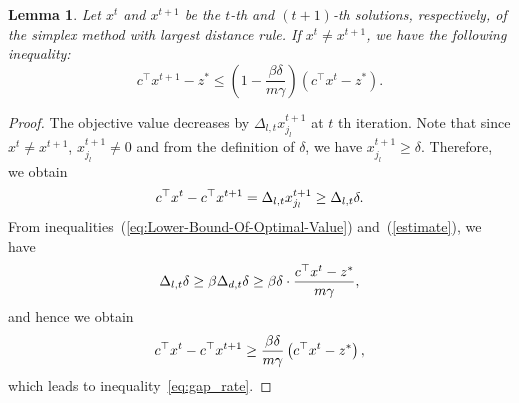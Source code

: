 \documentclass[10pt,a4paper]{amsart}
\newtheorem{lemma}{Lemma}
\begin{document}
\begin{lemma} \label{lm:gap_rate}
Let $x^t$ and $x^{t+1}$ be the $t$-th and $(t+1)$-th solutions, respectively, of the simplex method with largest distance rule.
If $x^t\not=x^{t+1}$, we have the following inequality:
\begin{equation} \label{eq:gap_rate}
  c^{\top} x^{t+1} - z^* \le \left( 1 - \frac{\beta \delta}{m \gamma} \right) \left( c^{\top} x^{t} - z^* \right).
\end{equation}
\end{lemma}

\begin{proof}
The objective value decreases by $\Delta_{l,t} x_{j_{l}}^{t+1}$ at $t$ th iteration.
Note that since $x^t\not=x^{t+1}$, $x_{j_{l}}^{t+1}\not=0$ and from the definition of $\delta$, we have $x_{j_{l}}^{t+1}\ge\delta$.
Therefore, we obtain 
\begin{equation} \notag
  c^{\top} x^{t} - c^{\top} x^{t+1} = \Delta_{l,t} x_{j_{l}}^{t+1} \ge \Delta_{l,t} \delta.
\end{equation}
From inequalities~(\ref{eq:Lower-Bound-Of-Optimal-Value}) and~(\ref{estimate}), we have
\begin{equation} \notag
  \Delta_{l,t} \delta \ge \beta\Delta_{d,t} \delta \ge \beta \delta \cdot \frac{c^{\top} x^t - z^*}{m\gamma},
\end{equation}
and hence we obtain
\begin{equation} \notag
  c^{\top} x^{t} - c^{\top} x^{t+1} \ge \frac{\beta\delta}{m\gamma} \left(c^{\top} x^t - z^* \right),
\end{equation}
which leads to inequality~\eqref{eq:gap_rate}. 
\end{proof}
\end{document}

